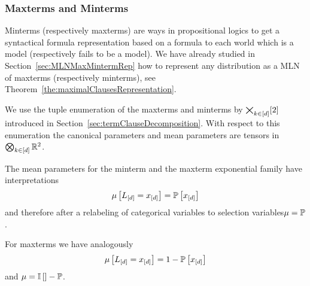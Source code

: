 \subsubsection{Maxterms and Minterms}

Minterms (respectively maxterms) are ways in propositional logics to get a syntactical formula representation based on a formula to each world which is a model (respectively fails to be a model).
We have already studied in Section~\ref{sec:MLNMaxMintermRep} how to represent any distribution as a MLN of maxterms (respectively minterms), see Theorem~\ref{the:maximalClausesRepresentation}.

We use the tuple enumeration of the maxterms and minterms by $\bigtimes_{k\in[d]}[2]$ introduced in Section~\ref{sec:termClauseDecomposition}.
With respect to this enumeration the canonical parameters and mean parameters are tensors in $\bigotimes_{k\in[d]}\mathbb{R}^2$. 


The mean parameters for the minterm and the maxterm exponential family have interpretations
	\[ \mu\left[L_{[d]}=x_{[d]}\right] 
	= \mathbb{P}\left[x_{[d]}\right] 
	\]
and therefore after a relabeling of categorical variables to selection variables$\mu=\mathbb{P}$.

For maxterms we have analogously
	\[ \mu\left[L_{[d]}=x_{[d]}\right] 
	= 1-\mathbb{P}\left[x_{[d]}\right] 
	\]
and $\mu = \mathbb{I}\left[\right]-\mathbb{P}$.


